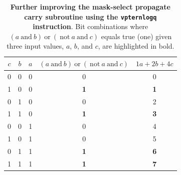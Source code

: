 \begin{table}[h]
\centering
\caption{\label{tab:mask-select-propagate-carry-vptern}\textbf{Further improving the mask-select propagate carry subroutine using the \texttt{vpternlogq} instruction}. Bit combinations where $(a \mathrm{~and~} b) \mathrm{~or~} (\mathrm{~not~} a \mathrm{~and~} c)$ equals true (one) given three input values, $a$, $b$, and $c$, are highlighted in bold.}
\begin{tabular}{ccccc}
\toprule
 $c$ & $b$& $a$ & $(a \mathrm{~and~} b) \mathrm{~or~} (\mathrm{~not~} a \mathrm{~and~} c)$ & $1a + 2b + 4c$\\\midrule
 0& 0& 0& 0& 0\\
 1& 0& 0& \textbf{1}& \textbf{1}\\
 0& 1& 0& 0& 2\\
 1& 1& 0& \textbf{1}& \textbf{3}\\
 0& 0& 1& 0& 4\\
 1& 0& 1& 0& 5\\
 0& 1& 1& \textbf{1}& \textbf{6}\\
 1& 1& 1& \textbf{1}& \textbf{7}\\\bottomrule
\end{tabular}
\end{table}

